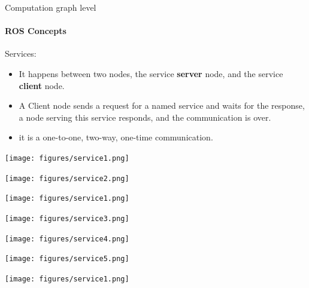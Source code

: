 \documentclass{beamer}
\begin{document}
\begin{frame}{Computation graph level}
    \framesubtitle{ROS Concepts}
    {\huge Services:}
    \vspace{0.2cm}
    \begin{itemize}
        \item It happens between two nodes, the service \textbf{server} node, and the service \textbf{client} node.
        
        \item A Client node sends a request for a named service and waits for the response, a node serving this service responds, and the communication is over.
        
        \item it is a one-to-one, two-way, one-time communication.
        
    \end{itemize}  
\end{frame}


\begin{frame}[plain]{}
 \centering
 \texttt{[image: figures/service1.png]}                                                              
\end{frame} 
\begin{frame}[plain]{}
    \centering
    \texttt{[image: figures/service2.png]}                                                              
\end{frame} 
\begin{frame}[plain]{}
    \centering
    \texttt{[image: figures/service1.png]}                                                              
\end{frame} 
\begin{frame}[plain]{}
    \centering
    \texttt{[image: figures/service3.png]}                                                              
\end{frame} 
\begin{frame}[plain]{}
    \centering
    \texttt{[image: figures/service4.png]}                                                              
  \end{frame} 
\begin{frame}[plain]{}
    \centering
    \texttt{[image: figures/service5.png]}                                                              
  \end{frame}
\begin{frame}[plain]{}
    \centering
    \texttt{[image: figures/service1.png]}                                                              
  \end{frame}       
     
\end{document}
